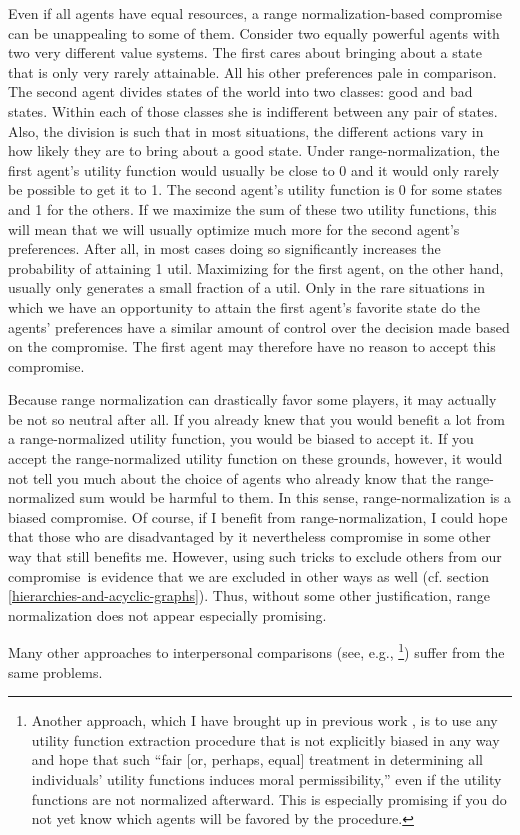 Even if all agents have equal resources, a range normalization-based
compromise can be unappealing to some of them. Consider two equally
powerful agents with two very different value systems. The first cares
about bringing about a state that is only very rarely attainable. All
his other preferences pale in comparison. The second agent divides
states of the world into two classes: good and bad states. Within each
of those classes she is indifferent between any pair of states. Also,
the division is such that in most situations, the different actions vary
in how likely they are to bring about a good state. Under
range-normalization, the first agent's utility function would usually be
close to 0 and it would only rarely be possible to get it to 1. The
second agent's utility function is 0 for some states and 1 for the
others. If we maximize the sum of these two utility functions, this will
mean that we will usually optimize much more for the second agent's
preferences. After all, in most cases doing so significantly increases
the probability of attaining 1 util. Maximizing for the first agent, on
the other hand, usually only generates a small fraction of a util. Only
in the rare situations in which we have an opportunity to attain the
first agent's favorite state do the agents' preferences have a similar
amount of control over the decision made based on the compromise. The
first agent may therefore have no reason to accept this compromise.

Because range normalization can drastically favor some players, it may
actually be not so neutral after all. If you already knew that you would
benefit a lot from a range-normalized utility function, you would be
biased to accept it. If you accept the range-normalized utility function
on these grounds, however, it would not tell you much about the choice
of agents who already know that the range-normalized sum would be
harmful to them. In this sense, range-normalization is a biased
compromise. Of course, if I benefit from range-normalization, I could
hope that those who are disadvantaged by it nevertheless compromise in
some other way that still benefits me. However, using such tricks to
exclude others from our compromise~is evidence that we are excluded in
other ways as well (cf. section
\ref{hierarchies-and-acyclic-graphs}). Thus, without some other justification, range
normalization does not appear especially promising.

Many other approaches to interpersonal comparisons (see, e.g.,
\cite{Sen2014-ns}\footnote{Another approach, which I
  have brought up in previous work
  \parencite{Oesterheld2016-pq}, is to use any utility
  function extraction procedure that is not explicitly biased in any way
  and hope that such ``fair {[}or, perhaps, equal{]} treatment in
  determining all individuals' utility functions induces moral
  permissibility,'' even if the utility functions are not normalized
  afterward. This is especially promising if you do not yet know which
  agents will be favored by the procedure.}) suffer from the same
problems.

